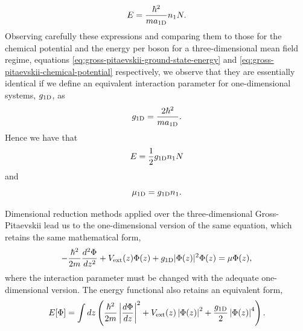 %
\begin{equation}
	E = \frac{\hbar^2}{m a_{ \mathrm{1D} }} n_1 N.
\end{equation}
%
Observing carefully these expressions and comparing them to those for the chemical potential and the
energy per boson
for a three-dimensional mean field regime, equations \eqref{eq:gross-pitaevskii-ground-state-energy} and
\eqref{eq:gross-pitaevskii-chemical-potential} respectively, we observe that they are essentially identical if we
define an equivalent interaction parameter for one-dimensional systems, $g_{ \mathrm{1D} }$, as
%
\begin{equation}
    \label{eq:gross-pitaevskii-interaction-parameter-1d}
    g_{ \mathrm{1D} } = \frac{2 \hbar^2}{m a_{ \mathrm{1D} }}.
\end{equation}
%
Hence we have that
%
\begin{equation}
    \label{eq:gross-pitaevskii-1d-energy}
    E = \frac{1}{2} g_{ \mathrm{1D} } n_1 N
\end{equation}
%
and
%
\begin{equation}
    \label{eq:gross-pitaevskii-1d-chemical-potential}
    \mu_\mathrm{1D} = g_{ \mathrm{1D} } n_1.
\end{equation}
%

Dimensional reduction methods \cite{bib:lieb-j-commun-math-Phys.224.17.2001, bib:cai-rosenkranzs-phys-rev-A.82.043623}
applied over the three-dimensional Gross-Pitaevskii lead us to the one-dimensional version of the same equation,
which retains the same mathematical form,
%
\begin{equation}
    \label{eq:gross-pitaevskii-equation-1d}
    -\frac{\hbar^2}{2m}\frac{d^2\Phi}{dz^2} + V_{\mathrm{ext}}(z) \Phi(z) + g_{ \mathrm{1D} } |\Phi(z)|^2 \Phi(z)
    = \mu \Phi(z),
\end{equation}
%
where the interaction parameter must be changed with the adequate one-dimensional version. The energy functional also
retains an equivalent form,
%
\begin{equation}
    \label{eq:gross-pitaevskii-1d-energy-functional}
    E[{\Phi}] = \int dz \left( \frac{\hbar^2}{2m} \left| \frac{d{\Phi}}{dz} \right|^2 + V_{\mathrm{ext}}(z) \left| {\Phi}(z) \right|^2 + \frac{g_{ \mathrm{1D} }}{2} \left| {\Phi}(z) \right|^4  \right).
\end{equation}


